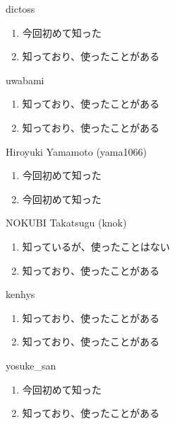 \begin{prework}{ dictoss }
  \begin{enumerate}
  \item 今回初めて知った
  \item 知っており、使ったことがある
  \end{enumerate}
\end{prework}

\begin{prework}{ uwabami }
  \begin{enumerate}
  \item 知っており、使ったことがある
  \item 知っており、使ったことがある
  \end{enumerate}
\end{prework}

\begin{prework}{ Hiroyuki Yamamoto (yama1066) }
  \begin{enumerate}
  \item 今回初めて知った
  \item 今回初めて知った
  \end{enumerate}
\end{prework}

\begin{prework}{ NOKUBI Takatsugu (knok) }
  \begin{enumerate}
  \item 知っているが、使ったことはない
  \item 知っており、使ったことがある
  \end{enumerate}
\end{prework}

\begin{prework}{ kenhys }
  \begin{enumerate}
  \item 知っており、使ったことがある
  \item 知っており、使ったことがある
  \end{enumerate}
\end{prework}

\begin{prework}{ yosuke\_san }
  \begin{enumerate}
  \item 今回初めて知った
  \item 知っており、使ったことがある
  \end{enumerate}
\end{prework}
